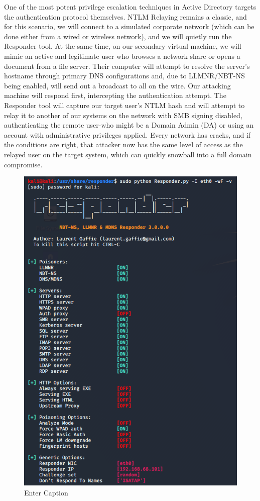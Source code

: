 One of the most potent privilege escalation techniques in Active Directory targets the authentication protocol themselves. NTLM Relaying remains a classic, and for this scenario, we will connect to a simulated corporate network (which can be done either from a wired or wireless network), and we will quietly run the Responder tool. At the same time, on our secondary virtual machine, we will mimic an active and legitimate user who browses a network share or opens a document from a file server. Their computer will attempt to resolve the server's hostname through primary DNS configurations and, due to LLMNR/NBT-NS being enabled, will send out a broadcast to all on the wire. Our attacking machine will respond first, intercepting the authentication attempt. The Responder tool will capture our target user's NTLM hash and will attempt to relay it to another of our systems on the network with SMB signing disabled, authenticating the remote user-who might be a Domain Admin (DA) or using an account with administrative privileges applied. Every network has cracks, and if the conditions are right, that attacker now has the same level of access as the relayed user on the target system, which can quickly snowball into a full domain compromise.

\begin{figure}
    \centering
    \includegraphics[width=0.75\linewidth]{responder.png}
    \caption{Enter Caption}
    \label{fig:placeholder}
\end{figure}

